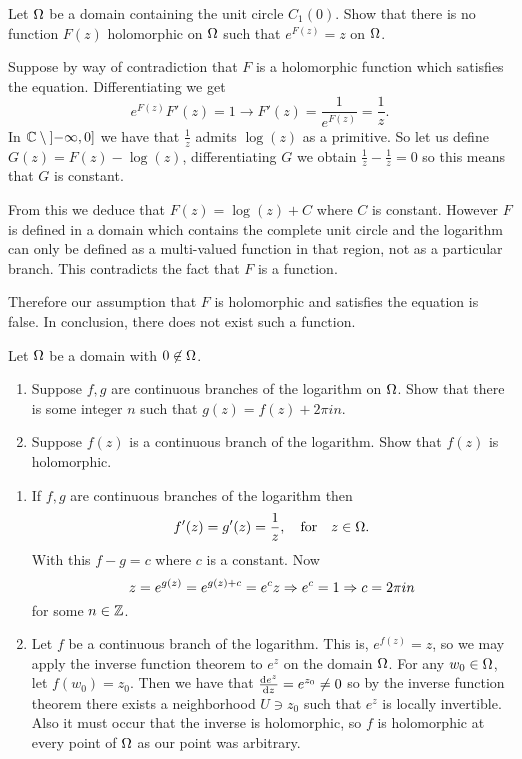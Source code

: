 \documentclass[12pt]{memoir}
\begin{document}
\begin{Ej}
    Let $\Omega$ be a domain containing the unit circle $C_1(0)$. Show that there is no function $F(z)$ holomorphic on $\Omega$ such that $e^{F(z)}=z$ on $\Omega$. 
\end{Ej}

\begin{ptcbr}
Suppose by way of contradiction that $F$ is a holomorphic function which satisfies the equation. Differentiating we get 
$$e^{F(z)}F'(z)=1\to F'(z)=\frac{1}{e^{F(z)}}=\frac1z.$$
In $\mathbb{C}\setminus\left\rbrack-\infty,0\right\rbrack$ we have that $\frac{1}{z}$ admits $\log(z)$ as a primitive. So let us define $G(z)=F(z)-\log(z)$, differentiating $G$ we obtain $\frac1z-\frac1z=0$ so this means that $G$ is constant.\par 
From this we deduce that $F(z)=\log(z)+C$ where $C$ is constant. However $F$ is defined in a domain which contains the complete unit circle and the logarithm can only be defined as a multi-valued function in that region, not as a particular branch. This contradicts the fact that $F$ is a function.\par 
Therefore our assumption that $F$ is holomorphic and satisfies the equation is false. In conclusion, there does not exist such a function.
\end{ptcbr}

\begin{Ej}
    Let $\Omega$ be a domain with $0\not\in\Omega$.
    \begin{enumerate}
        \itemsep=-0.4em
        \item Suppose $f,g$ are continuous branches of the logarithm on $\Omega$. Show that there is some integer $n$ such that $g(z)=f(z)+2\pi i n$. 
        \item Suppose $f(z)$ is a continuous branch of the logarithm. Show that $f(z)$ is holomorphic. 
    \end{enumerate}
\end{Ej}

\begin{ptcbr}
    \begin{enumerate}
        \itemsep=-0.4em
        \item If $f,g$ are continuous branches of the logarithm then 
        $$f'(z)=g'(z)=\frac{1}{z},\quad\text{for}\quad z\in\Omega.$$
        With this $f-g=c$ where $c$ is a constant. Now 
        $$z=e^{g(z)}=e^{g(z)+c}=e^c z\Rightarrow e^c=1\Rightarrow c=2\pi i n$$
        for some $n\in\mathbb{Z}$. 
        \item Let $f$ be a continuous branch of the logarithm. This is, $e^{f(z)}=z$, so we may apply the inverse function theorem to $e^z$ on the domain $\Omega$.
        For any $w_0\in\Omega$, let $f(w_0)=z_0$. Then we have that $\dv{e^z}{z}(z_0)=e^{z_0}\neq 0$ so by the inverse function theorem there exists a neighborhood $U\ni z_0$ such that $e^z$ is locally invertible. Also it must occur that the inverse is holomorphic, so $f$ is holomorphic at every point of $\Omega$ as our point was arbitrary. 
    \end{enumerate}
\end{ptcbr}
\end{document}
